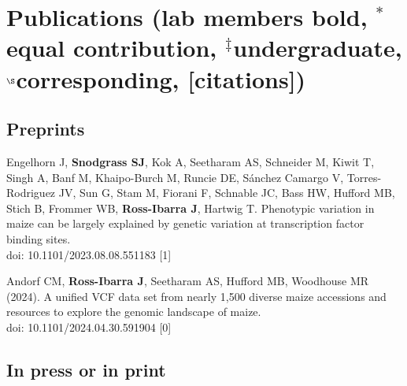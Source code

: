 \documentclass[letterpaper,10pt]{article}
\renewenvironment{itemize}{
  \begin{list}{}{
    \setlength{\leftmargin}{1.5em}
  }
}{
  \end{list}
}
\begin{document}
\begin{itemize}
\end{itemize}

\newpage
\section*{Publications {\small(lab members bold, $^*$equal contribution, $^\ddagger$undergraduate, $^\S$corresponding, [citations])}}


\subsection*{Preprints}
\begin{itemize}
  \setlength\itemsep{0ex}
\item Engelhorn J, \textbf{Snodgrass SJ}, Kok A, Seetharam AS, Schneider M, Kiwit T, Singh A, Banf M, Khaipo-Burch M, Runcie DE, Sánchez Camargo V, Torres-Rodriguez JV, Sun G, Stam M, Fiorani F, Schnable JC, Bass HW, Hufford MB, Stich B, Frommer WB, \textbf{Ross-Ibarra J}, Hartwig T. Phenotypic variation in maize can be largely explained by genetic variation at transcription factor binding sites. \\ doi: 10.1101/2023.08.08.551183
 [1]\\


\item Andorf CM, \textbf{Ross-Ibarra J}, Seetharam AS, Hufford MB,  Woodhouse MR (2024). A unified VCF data set from nearly 1,500 diverse maize accessions and resources to explore the genomic landscape of maize. \\
doi: 10.1101/2024.04.30.591904
 [0]\\

\end{itemize}

\subsection*{In press or in print} %
\end{document}
